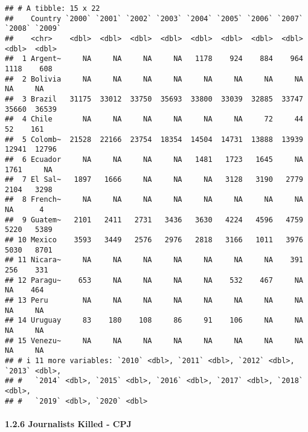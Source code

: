 \documentclass[
  11pt,
]{article}
\begin{document}
\begin{verbatim}
## # A tibble: 15 x 22
##    Country `2000` `2001` `2002` `2003` `2004` `2005` `2006` `2007` `2008` `2009`
##    <chr>    <dbl>  <dbl>  <dbl>  <dbl>  <dbl>  <dbl>  <dbl>  <dbl>  <dbl>  <dbl>
##  1 Argent~     NA     NA     NA     NA   1178    924    884    964   1118    608
##  2 Bolivia     NA     NA     NA     NA     NA     NA     NA     NA     NA     NA
##  3 Brazil   31175  33012  33750  35693  33800  33039  32885  33747  35660  36539
##  4 Chile       NA     NA     NA     NA     NA     NA     72     44     52    161
##  5 Colomb~  21528  22166  23754  18354  14504  14731  13888  13939  12941  12796
##  6 Ecuador     NA     NA     NA     NA   1481   1723   1645     NA   1761     NA
##  7 El Sal~   1897   1666     NA     NA     NA   3128   3190   2779   2104   3298
##  8 French~     NA     NA     NA     NA     NA     NA     NA     NA     NA      4
##  9 Guatem~   2101   2411   2731   3436   3630   4224   4596   4759   5220   5389
## 10 Mexico    3593   3449   2576   2976   2818   3166   1011   3976   5030   8701
## 11 Nicara~     NA     NA     NA     NA     NA     NA     NA    391    256    331
## 12 Paragu~    653     NA     NA     NA     NA    532    467     NA     NA    464
## 13 Peru        NA     NA     NA     NA     NA     NA     NA     NA     NA     NA
## 14 Uruguay     83    180    108     86     91    106     NA     NA     NA     NA
## 15 Venezu~     NA     NA     NA     NA     NA     NA     NA     NA     NA     NA
## # i 11 more variables: `2010` <dbl>, `2011` <dbl>, `2012` <dbl>, `2013` <dbl>,
## #   `2014` <dbl>, `2015` <dbl>, `2016` <dbl>, `2017` <dbl>, `2018` <dbl>,
## #   `2019` <dbl>, `2020` <dbl>
\end{verbatim}

\paragraph{1.2.6 Journalists Killed -
CPJ}\label{journalists-killed---cpj}
\end{document}
